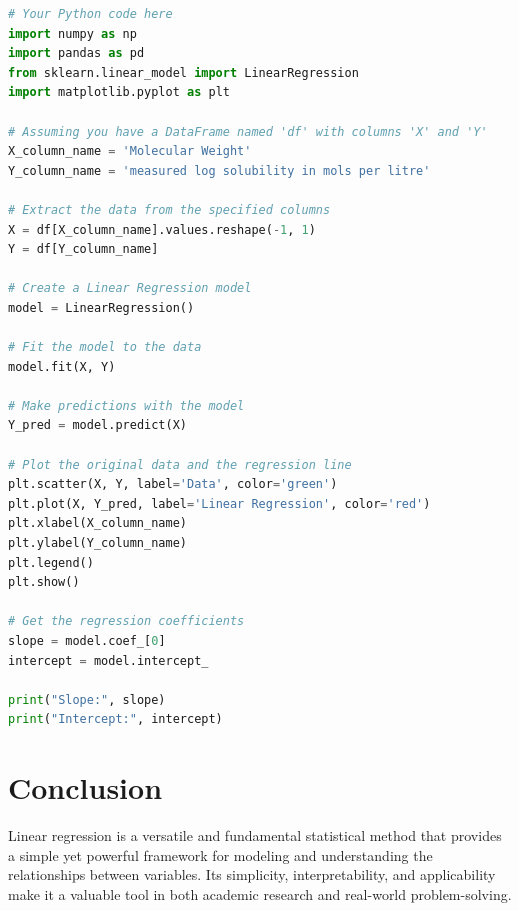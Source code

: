 \documentclass{article}
\begin{document}
\begin{lstlisting}[language=Python, caption=Python code for linear regression, label=lst:linear_regression]
# Your Python code here
import numpy as np
import pandas as pd
from sklearn.linear_model import LinearRegression
import matplotlib.pyplot as plt

# Assuming you have a DataFrame named 'df' with columns 'X' and 'Y'
X_column_name = 'Molecular Weight'
Y_column_name = 'measured log solubility in mols per litre'

# Extract the data from the specified columns
X = df[X_column_name].values.reshape(-1, 1)
Y = df[Y_column_name]

# Create a Linear Regression model
model = LinearRegression()

# Fit the model to the data
model.fit(X, Y)

# Make predictions with the model
Y_pred = model.predict(X)

# Plot the original data and the regression line
plt.scatter(X, Y, label='Data', color='green')
plt.plot(X, Y_pred, label='Linear Regression', color='red')
plt.xlabel(X_column_name)
plt.ylabel(Y_column_name)
plt.legend()
plt.show()

# Get the regression coefficients
slope = model.coef_[0]
intercept = model.intercept_

print("Slope:", slope)
print("Intercept:", intercept)
\end{lstlisting}

\section*{Conclusion}

Linear regression is a versatile and fundamental statistical method that provides a simple yet powerful framework for modeling and understanding the relationships between variables. Its simplicity, interpretability, and applicability make it a valuable tool in both academic research and real-world problem-solving.
\end{document}

